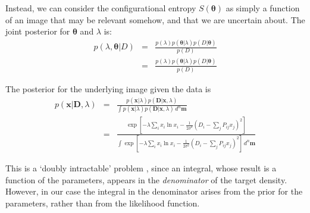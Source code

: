 \documentclass[entropy,article,submit,moreauthors,pdftex,10pt,a4paper]{Definitions/mdpi}
\newcommand{\xx}{\boldsymbol{\theta}}
\newcommand{\data}{D}
\begin{document}
Instead, we can consider the configurational
entropy $S(\xx)$ as simply a function of an image that may
be relevant somehow, and that we are uncertain about. The joint posterior
for $\xx$ and $\lambda$ is:
\begin{eqnarray}
p(\lambda, \xx | \data) &=&
\frac{p(\lambda)p(\xx | \lambda)p(\data | \xx)}
{p(\data)}\\
&=&
\frac{p(\lambda)p(\xx | \lambda)p(\data | \xx)}
{p(\data)}
\end{eqnarray}


The posterior for the underlying image given the data is
\begin{eqnarray}
p(\boldsymbol{x} | \boldsymbol{D}, \lambda)
&=& \frac{p(\boldsymbol{x} | \lambda)p(\boldsymbol{D}|\boldsymbol{x}, \lambda)}
{\int p(\boldsymbol{x}|\lambda)p(\boldsymbol{D}|\boldsymbol{x}, \lambda) \,d^n\boldsymbol{m}}\\
&=& \frac{\exp\left[-\lambda \sum_i x_i\ln x_i
-\frac{1}{2\sigma^2}\left(D_i - \sum_{j} P_{ij}x_{j}\right)^2\right]}
{\int \exp\left[-\lambda \sum_i x_i\ln x_i
-\frac{1}{2\sigma^2}\left(D_i - \sum_{j} P_{ij}x_{j}\right)^2\right]\, d^n\boldsymbol{m}}
\end{eqnarray}

This is a `doubly intractable' problem \citep{murray}, since an integral, whose
result is a function of the parameters, appears in the {\em denominator} of the
target density. However, in our case the integral in the
denominator arises from the prior for the parameters, rather than from the
likelihood function.

% 
\end{document}
